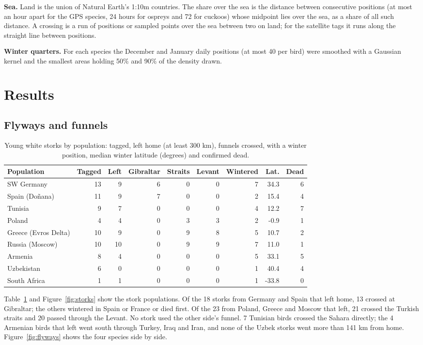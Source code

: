 \documentclass[11pt,a4paper]{article}
\begin{document}
\textbf{Sea.} Land is the union of Natural Earth's 1:10m countries. The share over the sea is the distance between consecutive positions (at most an hour apart for the GPS species, 24 hours for ospreys and 72 for cuckoos) whose midpoint lies over the sea, as a share of all such distance. A crossing is a run of positions or sampled points over the sea between two on land; for the satellite tags it runs along the straight line between positions.

\textbf{Winter quarters.} For each species the December and January daily positions (at most 40 per bird) were smoothed with a Gaussian kernel and the smallest areas holding 50\% and 90\% of the density drawn.

\section{Results}
\subsection{Flyways and funnels}
\begin{table}[tbp]\centering\small\caption{Young white storks by population: tagged, left home (at least 300 km), funnels crossed, with a winter position, median winter latitude (degrees) and confirmed dead.}\label{tab:pops}\begin{tabular}{lrrrrrrrr}\toprule Population & Tagged & Left & Gibraltar & Straits & Levant & Wintered & Lat. & Dead\\\midrule
SW Germany & 13 & 9 & 6 & 0 & 0 & 7 & 34.3 & 6\\
Spain (Doñana) & 11 & 9 & 7 & 0 & 0 & 2 & 15.4 & 4\\
Tunisia & 9 & 7 & 0 & 0 & 0 & 4 & 12.2 & 7\\
Poland & 4 & 4 & 0 & 3 & 3 & 2 & -0.9 & 1\\
Greece (Evros Delta) & 10 & 9 & 0 & 9 & 8 & 5 & 10.7 & 2\\
Russia (Moscow) & 10 & 10 & 0 & 9 & 9 & 7 & 11.0 & 1\\
Armenia & 8 & 4 & 0 & 0 & 0 & 5 & 33.1 & 5\\
Uzbekistan & 6 & 0 & 0 & 0 & 0 & 1 & 40.4 & 4\\
South Africa & 1 & 1 & 0 & 0 & 0 & 1 & -33.8 & 0\\
\bottomrule\end{tabular}\end{table}
Table~\ref{tab:pops} and Figure~\ref{fig:storks} show the stork populations. Of the 18 storks from Germany and Spain that left home, 13 crossed at Gibraltar; the others wintered in Spain or France or died first. Of the 23 from Poland, Greece and Moscow that left, 21 crossed the Turkish straits and 20 passed through the Levant. No stork used the other side's funnel. 7 Tunisian birds crossed the Sahara directly; the 4 Armenian birds that left went south through Turkey, Iraq and Iran, and none of the Uzbek storks went more than 141 km from home. Figure~\ref{fig:flyways} shows the four species side by side.
\end{document}
